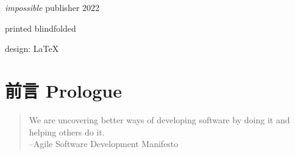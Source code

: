 \documentclass{book}        %
\date{}
\begin{document}



\begin{titlepage}\thispagestyle{empty} \vspace*{3em}{\centering\Huge 软件开发过程改进(V01初稿) \par}\clearpage
\newpage \thispagestyle{empty} \mbox{} \cleardoublepage
\thispagestyle{empty} \cleardoublepage



\thispagestyle{empty} \vspace*{\fill} \parbox{.8\textwidth}{\raggedright \scriptsize
\textit{impossible} publisher 2022

printed blindfolded

design: \LaTeX
}
\end{titlepage}
\clearpage \thispagestyle{empty}\cleardoublepage
\newpage %


\tableofcontents %


\chapter*{前言 Prologue} %

\begin{quote}
We are uncovering better ways of developing software by doing it and helping others do it.\\
--Agile Software Development Manifesto
\end{quote}
\end{document}

